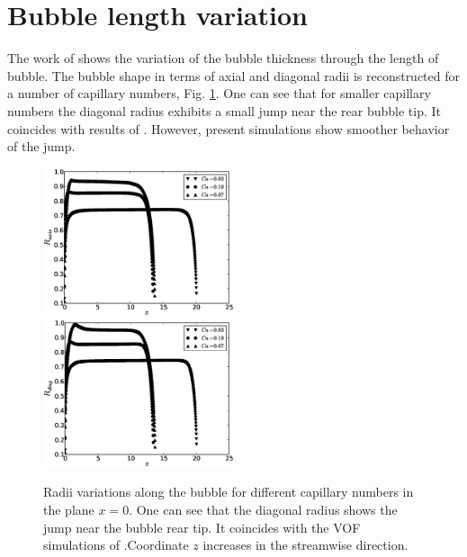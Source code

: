 \documentclass{article}
\begin{document}
\section{Bubble length variation}
The work of \citet{wang-non-circular} shows the variation of the bubble
thickness through the length of
bubble. The bubble shape in terms of axial and diagonal radii is reconstructed for a number of
capillary numbers, Fig. \ref{fig:bubble:variation:capillaries}. One can see that for smaller
capillary numbers the diagonal radius exhibits a small jump near the rear bubble tip. It coincides
with results of \citet{wang-non-circular}. However, present simulations show smoother behavior of
the jump.  
\begin{figure}[ht]
\includegraphics[width=0.5\textwidth]{Figures/bubble_rad_axis.eps}
\includegraphics[width=0.5\textwidth]{Figures/bubble_rad_diag.eps}\\
\caption{Radii variations along the bubble for different capillary numbers in the plane $x=0$.
One can see that the diagonal radius shows the jump near the bubble rear tip. It coincides with the
VOF simulations of \citet{wang-non-circular}.Coordinate $z$ increases in the streamwise direction.
\label{fig:bubble:variation:capillaries}}
\end{figure}
\end{document}
